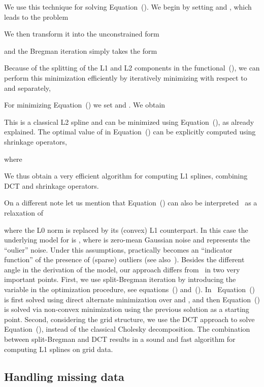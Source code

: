 \documentclass[preprint]{imsart}
\begin{document}
We use this technique for solving Equation~(). We begin by setting  and , which leads to the problem

We then transform it into the unconstrained form

and the Bregman iteration simply takes the form


Because of the splitting of the L1 and L2 components in the functional~(), we can perform this minimization efficiently by iteratively minimizing with respect to  and  separately,

For minimizing Equation~() we set  and . We obtain

This is a classical L2 spline and can be minimized using Equation~(), as already explained.
The optimal value of  in Equation~() can be explicitly computed using shrinkage operators,

where

We thus obtain a very efficient algorithm for computing L1 splines, combining DCT and shrinkage operators.

On a different note let us mention that Equation~() can also be interpreted~\cite{mateos12} as a relaxation of

where the L0 norm is replaced by its (convex) L1 counterpart. In this case the underlying model for  is , where  is zero-mean Gaussian noise and  represents the ``oulier'' noise. Under this assumptions,  practically becomes an ``indicator function'' of the presence of (sparse) outliers (see also~\cite{black91}). Besides the different angle in the derivation of the model, our approach differs from~\cite{mateos12} in two very important points. First, we use split-Bregman iteration by introducing the variable  in the optimization procedure, see equations~() and~(). In~\cite{mateos12} Equation~() is first solved using direct alternate minimization over  and , and then Equation~() is solved via non-convex minimization using the previous solution as a starting point.
Second, considering the grid structure, we use the DCT approach to solve Equation~(), instead of the classical Cholesky decomposition. The combination between split-Bregman and DCT results in a sound and fast algorithm for computing L1 splines on grid data.


\subsection{Handling missing data}
\end{document}
